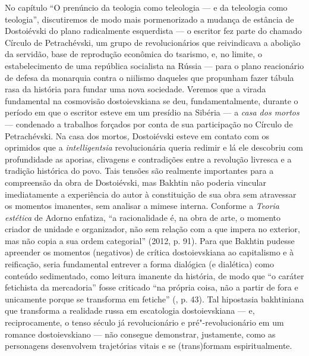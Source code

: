 No capítulo ``O prenúncio da teologia como teleologia --- e da teleologia
como teologia'', discutiremos de modo mais pormenorizado a mudança de
estância de Dostoiévski do plano radicalmente esquerdista --- o escritor
fez parte do chamado Círculo de Petrachévski, um grupo de
revolucionários que reivindicava a abolição da servidão, base de
reprodução econômica do tsarismo, e, no limite, o estabelecimento de uma
república socialista na Rússia --- para o plano reacionário de defesa da
monarquia contra o niilismo daqueles que propunham fazer tábula rasa da
história para fundar uma nova sociedade. Veremos que a virada
fundamental na cosmovisão dostoievskiana se deu, fundamentalmente,
durante o período em que o escritor esteve em um presídio na Sibéria ---
a \emph{casa dos mortos} --- condenado a trabalhos forçados por conta de
sua participação no Círculo de Petrachévski. Na casa dos mortos\emph{,}
Dostoiévski esteve em contato com os oprimidos que a
\emph{intelligentsia} revolucionária queria redimir e lá ele descobriu
com profundidade as aporias, clivagens e contradições entre a revolução
livresca e a tradição histórica do povo. Tais tensões são realmente
importantes para a compreensão da obra de Dostoiévski, mas Bakhtin não
poderia vincular imediatamente a experiência do autor à constituição de
sua obra sem atravessar os momentos imanentes, sem analisar a mimese
interna. Conforme a \emph{Teoria estética} de Adorno enfatiza, ``a
racionalidade é, na obra de arte, o momento criador de unidade e
organizador, não sem relação com a que impera no exterior, mas não copia
a sua ordem categorial'' (2012, p. 91). Para que Bakhtin pudesse
apreender os momentos (negativos) de crítica dostoievskiana ao
capitalismo e à reificação, seria fundamental entrever a forma dialógica
(e dialética) como conteúdo sedimentado, como leitura imanente da
história, de modo que ``o caráter fetichista da mercadoria'' fosse
criticado ``na própria coisa, não a partir de fora e unicamente porque
se transforma em fetiche'' (, p. 43). Tal hipostasia bakhtiniana que
transforma a realidade russa em escatologia dostoievskiana --- e,
reciprocamente, o tenso século  já revolucionário e
pré"-revolucionário em um romance dostoievskiano --- não consegue
demonstrar, justamente, como as personagens desenvolvem trajetórias
vitais e se (trans)formam espiritualmente.

